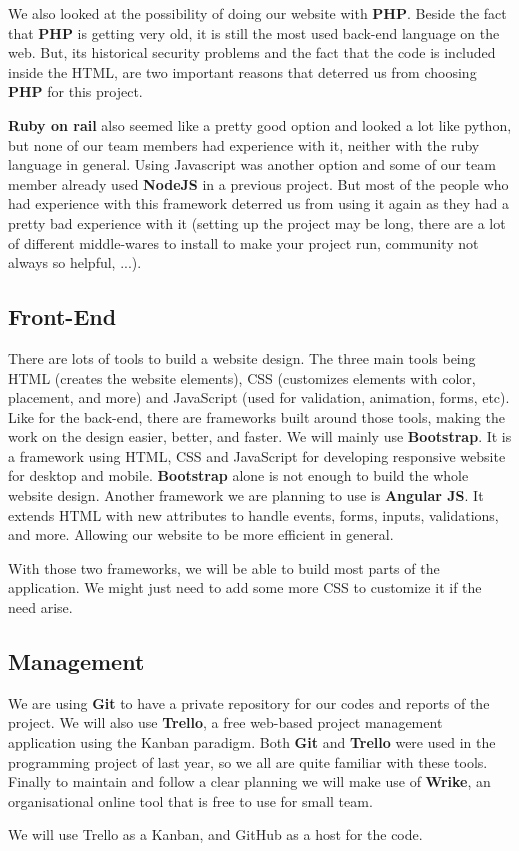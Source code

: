 We also looked at the possibility of doing our website with \textbf{PHP}.
Beside the fact that \textbf{PHP} is getting very old, it is still the most
used back-end language on the web. But, its historical security problems
and the fact that the code is included inside the HTML, are two important
reasons that deterred us from choosing \textbf{PHP} for this
project.\newline

\textbf{Ruby on rail} also seemed like a pretty good option and looked a
lot like python, but none of our team members had experience with it,
neither with the ruby language in general. Using Javascript was another
option and some of our team member already used \textbf{NodeJS} in a
previous project. But most of the people who had experience with this
framework deterred us from using it again as they had a pretty bad
experience with it (setting up the project may be long, there are a lot of
different middle-wares to install to make your project run, community not
always so helpful, ...).

\subsection{Front-End}

There are lots of tools to build a website design. The three main tools
being HTML (creates the website elements), CSS (customizes elements with
color, placement, and more) and JavaScript (used for validation, animation,
forms, etc). Like for the back-end, there are frameworks built around those
tools, making the work on the design easier, better, and faster. We will
mainly use \textbf{Bootstrap}. It is a framework using HTML, CSS and
JavaScript for developing responsive website for desktop and mobile.
\textbf{Bootstrap} alone is not enough to build the whole website design.
Another framework we are planning to use is \textbf{Angular JS}. It extends
HTML with new attributes to handle events, forms, inputs, validations, and
more. Allowing our website to be more efficient in general. \newline

With those two frameworks, we will be able to build most parts of the
application. We might just need to add some more CSS to customize it if the
need arise.

\subsection{Management}

We are using \textbf{Git} to have a private repository for our codes and
reports of the project. We will also use \textbf{Trello}, a free web-based
project management application using the Kanban paradigm. Both \textbf{Git}
and \textbf{Trello} were used in the programming project of last year, so
we all are quite familiar with these tools. Finally to maintain and follow a clear planning we will make use of \textbf{Wrike}, an organisational online tool that is free to use for small team.\newline

We will use Trello as a Kanban, and GitHub as a host for the code. \newline
